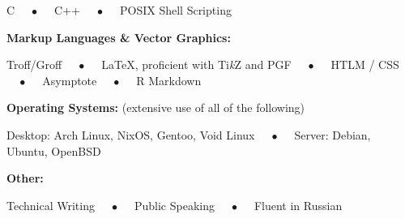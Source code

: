 \documentclass{article}
\numberwithin{equation}{section}
\begin{document}
\hspace{3.0em} C $\quad\bullet\quad$ C++ $\quad\bullet\quad$ POSIX Shell Scripting

\vspace{0.5em}

\hspace{1.5em} \textbf{Markup Languages \& Vector Graphics:}

\hspace{3.0em} Troff/Groff $\quad\bullet\quad$ {\LaTeX}, proficient with Ti\textit{k}Z and PGF $\quad\bullet\quad$ HTLM / CSS $\quad\bullet\quad$ Asymptote $\quad\bullet\quad$ R Markdown

\vspace{0.5em}

\hspace{1.5em} \textbf{Operating Systems:} (extensive use of all of the following)

\hspace{3.0em} Desktop: Arch Linux, NixOS, Gentoo, Void Linux $\quad\bullet\quad$ Server: Debian, Ubuntu, OpenBSD

\vspace{0.5em}

\hspace{1.5em} \textbf{Other:}

\hspace{3.0em} Technical Writing $\quad\bullet\quad$ Public Speaking $\quad\bullet\quad$ Fluent in Russian
\end{document}
